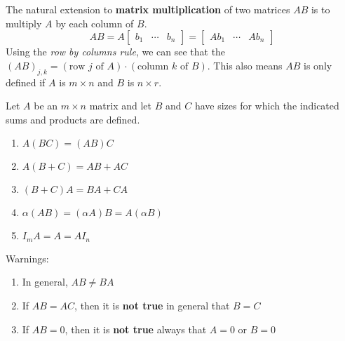 \begin{definition}
The natural extension to \textbf{matrix multiplication} of two matrices $AB$ is to multiply $A$ by each column of $B$. 
$$AB = A \begin{bmatrix}
b_{1} & \cdots & b_{n}
\end{bmatrix} = \begin{bmatrix}
Ab_{1} & \cdots & Ab_{n}
\end{bmatrix}$$
Using the \textit{row by columns rule}, we can see that the $(AB)_{j,k} = (\text{row $j$ of $A$}) \cdot (\text{column $k$ of $B$})$. This also means $AB$ is only defined if $A$ is $m \times n$ and $B$ is $n \times r$. 

Let $A$ be an $m \times n$ matrix and let $B$ and $C$ have sizes for which the indicated sums and products are defined. 
\begin{enumerate}
	\item $A(BC) = (AB)C$
	\item $A(B + C) = AB + AC$
	\item $(B + C)A = BA + CA $
	\item $\alpha (AB) = (\alpha A)B = A(\alpha B)$
	\item $I_m A = A = AI_n$
\end{enumerate}
Warnings: 
\begin{enumerate}
	\item In general, $AB \neq BA$ 
	\item If $AB = AC$, then it is \textbf{not true} in general that $B=C$
	\item If $AB = 0$, then it is \textbf{not true} always that $A=0$ or $B=0$
\end{enumerate}
\end{definition}

